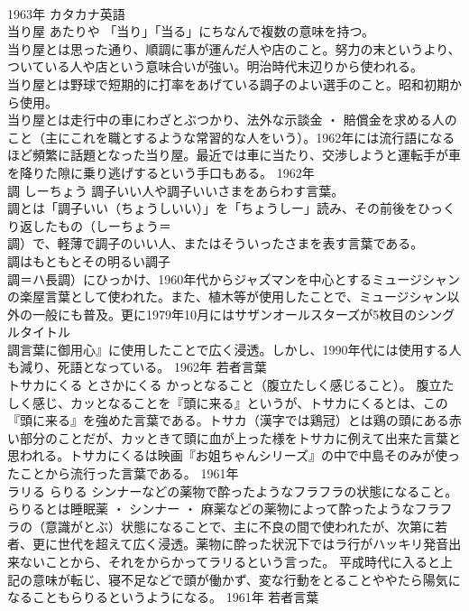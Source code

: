 \documentclass[8pt]{extreport}
\begin{document}
\begin{CJK}{UTF8}{min}
\\	1963年	カタカナ英語	
\\	当り屋	あたりや	「当り」「当る」にちなんで複数の意味を持つ。	
\\	当り屋とは思った通り、順調に事が運んだ人や店のこと。努力の末というより、ついている人や店という意味合いが強い。明治時代末辺りから使われる。 
\\	当り屋とは野球で短期的に打率をあげている調子のよい選手のこと。昭和初期から使用。 
\\	当り屋とは走行中の車にわざとぶつかり、法外な示談金 ・ 賠償金を求める人のこと（主にこれを職とするような常習的な人をいう）。1962年には流行語になるほど頻繁に話題となった当り屋。最近では車に当たり、交渉しようと運転手が車を降りた隙に乗り逃げするという手口もある。	1962年	
\\	調	しーちょう	調子いい人や調子いいさまをあらわす言葉。	
\\	調とは「調子いい（ちょうしいい）」を「ちょうしー」読み、その前後をひっくり返したもの（しーちょう＝
\\	調）で、軽薄で調子のいい人、またはそういったさまを表す言葉である。
\\	調はもともとその明るい調子
\\	調＝ハ長調）にひっかけ、1960年代からジャズマンを中心とするミュージシャンの楽屋言葉として使われた。また、植木等が使用したことで、ミュージシャン以外の一般にも普及。更に1979年10月にはサザンオールスターズが5枚目のシングルタイトル
\\	調言葉に御用心』に使用したことで広く浸透。しかし、1990年代には使用する人も減り、死語となっている。	1962年	若者言葉	
\\	トサカにくる	とさかにくる	かっとなること（腹立たしく感じること）。	腹立たしく感じ、カッとなることを『頭に来る』というが、トサカにくるとは、この『頭に来る』を強めた言葉である。トサカ（漢字では鶏冠）とは鶏の頭にある赤い部分のことだが、カッときて頭に血が上った様をトサカに例えて出来た言葉と思われる。トサカにくるは映画『お姐ちゃんシリーズ』の中で中島そのみが使ったことから流行った言葉である。	1961年	
\\	ラリる	らりる	シンナーなどの薬物で酔ったようなフラフラの状態になること。	らりるとは睡眠薬 ・ シンナー ・ 麻薬などの薬物によって酔ったようなフラフラの（意識がとぶ）状態になることで、主に不良の間で使われたが、次第に若者、更に世代を超えて広く浸透。薬物に酔った状況下ではラ行がハッキリ発音出来ないことから、それをからかってラリるという言った。 平成時代に入ると上記の意味が転じ、寝不足などで頭が働かず、変な行動をとることややたら陽気になることもらりるというようになる。	1961年	若者言葉	

\end{CJK}
\end{document}
